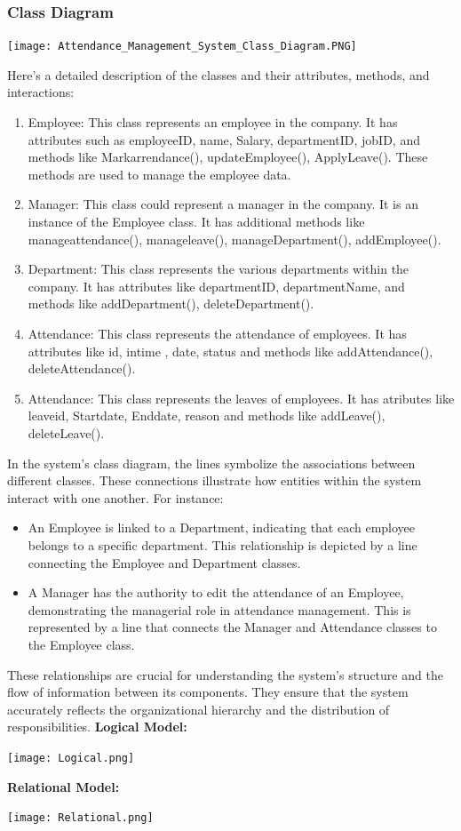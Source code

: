 \documentclass[a4paper, 12pt]{article}
\begin{document}
\subsubsection{Class Diagram}
\begin{center}
\texttt{[image: Attendance\_Management\_System\_Class\_Diagram.PNG]}\par
\end{center}
Here’s a detailed description of the classes and their attributes, methods, and interactions:
\begin{enumerate}
    \item Employee: This class represents an employee in the company. It has attributes such as employeeID, name, Salary, departmentID, jobID, and methods like Markarrendance(), updateEmployee(), ApplyLeave(). These methods are used to manage the employee data.
    \item Manager: This class could represent a manager in the company. It is an instance of the Employee class. It has additional methods like manageattendance(), manageleave(), manageDepartment(), addEmployee().
    \item Department: This class represents the various departments within the company. It has attributes like departmentID, departmentName, and methods like addDepartment(), deleteDepartment().
    \item Attendance: This class represents the attendance of employees. It has attributes like id, intime , date, status and methods like addAttendance(), deleteAttendance().
    \item Attendance: This class represents the leaves of employees. It has atributes like leaveid, Startdate, Enddate, reason and methods like addLeave(), deleteLeave().
\end{enumerate}
In the system’s class diagram, the lines symbolize the associations between different classes. These connections illustrate how entities within the system interact with one another. For instance:
\begin{itemize}
    \item An Employee is linked to a Department, indicating that each employee belongs to a specific department. This relationship is depicted by a line connecting the Employee and Department classes.
    \item A Manager has the authority to edit the attendance of an Employee, demonstrating the managerial role in attendance management. This is represented by a line that connects the Manager and Attendance classes to the Employee class.
\end{itemize}
These relationships are crucial for understanding the system’s structure and the flow of information between its components. They ensure that the system accurately reflects the organizational hierarchy and the distribution of responsibilities.
\textbf{Logical Model:}
\begin{center}
\texttt{[image: Logical.png]}\par
\end{center}
\textbf{Relational Model:}
\begin{center}
\texttt{[image: Relational.png]}\par
\end{center}
\end{document}

